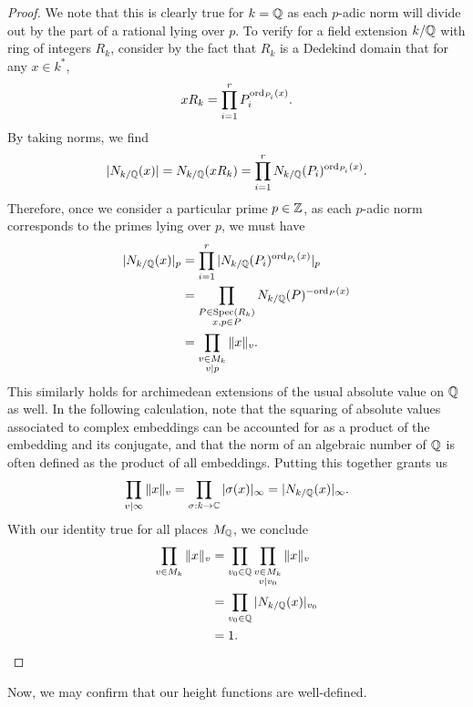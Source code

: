 \documentclass[12pt]{article}
\begin{document}
    \begin{proof}
        We note that this is clearly true for $k = \mathbb{Q}$ as each $p$-adic norm will divide out by the part of a rational lying over $p$.
        To verify for a field extension $k/\mathbb{Q}$ with ring of integers $R_k$,
        consider by the fact that $R_k$ is a Dedekind domain that for any $x \in k^*$,
        \[
            xR_k = \prod_{i = 1}^r P_i^{{\rm ord}_{P_i}(x)}.
        \]
        By taking norms, we find
        \[
            |N_{k/\mathbb{Q}}(x)| = N_{k / \mathbb{Q}}(xR_k) = \prod_{i = 1}^r N_{k / \mathbb{Q}}(P_i)^{{\rm ord}_{P_i}(x)}.
        \]
        Therefore, once we consider a particular prime $p \in \mathbb{Z}$,
        as each $p$-adic norm corresponds to the primes lying over $p$,
        we must have
        \begin{align*}
            |N_{k/\mathbb{Q}}(x)|_p 
            & = \prod_{i = 1}^r |N_{k / \mathbb{Q}}(P_i)^{{\rm ord}_{P_i}(x)}|_p \\
            & = \prod_{\substack{P \in {\rm Spec}(R_k) \\ x, p \in P}} N_{k / \mathbb{Q}}(P)^{-{\rm ord}_P(x)} \\
            & = \prod_{\substack{v \in M_k \\ v | p}} \|x\|_v.
        \end{align*}
        This similarly holds for archimedean extensions of the usual absolute value on $\mathbb{Q}$ as well.
        In the following calculation, 
        note that the squaring of absolute values associated to complex embeddings can be accounted for as a product of the embedding and its conjugate,
        and that the norm of an algebraic number of $\mathbb{Q}$ is often defined as the product of all embeddings.
        Putting this together grants us
        \[
          \prod_{v | \infty} \|x\|_v 
          = \prod_{\sigma : k \to \mathbb{C}} |\sigma(x)|_\infty
          = |N_{k/\mathbb{Q}}(x)|_\infty.  
        \]
        With our identity true for all places $M_{\mathbb{Q}}$, we conclude
        \begin{align*}
            \prod_{v \in M_k} \|x\|_v
            & =  \prod_{v_0 \in \mathbb{Q}} \prod_{\substack{v \in M_k \\ v | v_0}} \|x\|_v \\
            & = \prod_{v_0 \in \mathbb{Q}} |N_{k/\mathbb{Q}}(x)|_{v_0} \\
            & = 1.
        \end{align*}
    \end{proof}

    Now, we may confirm that our height functions are well-defined.
\end{document}
